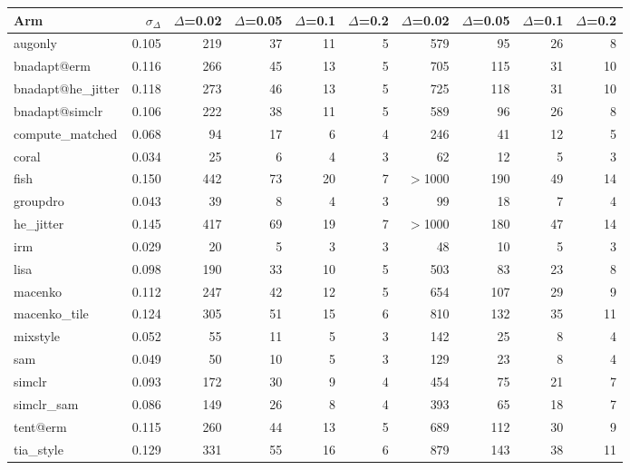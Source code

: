 \begin{tabular}{lrrrrrrrrr}
\toprule
Arm & $\sigma_\Delta$ & $\Delta$=0.02 & $\Delta$=0.05 & $\Delta$=0.1 & $\Delta$=0.2 & $\Delta$=0.02 & $\Delta$=0.05 & $\Delta$=0.1 & $\Delta$=0.2 \\
\midrule
augonly & 0.105 & 219 & 37 & 11 & 5 & 579 & 95 & 26 & 8 \\
bnadapt@erm & 0.116 & 266 & 45 & 13 & 5 & 705 & 115 & 31 & 10 \\
bnadapt@he\_jitter & 0.118 & 273 & 46 & 13 & 5 & 725 & 118 & 31 & 10 \\
bnadapt@simclr & 0.106 & 222 & 38 & 11 & 5 & 589 & 96 & 26 & 8 \\
compute\_matched & 0.068 & 94 & 17 & 6 & 4 & 246 & 41 & 12 & 5 \\
coral & 0.034 & 25 & 6 & 4 & 3 & 62 & 12 & 5 & 3 \\
fish & 0.150 & 442 & 73 & 20 & 7 & $>$1000 & 190 & 49 & 14 \\
groupdro & 0.043 & 39 & 8 & 4 & 3 & 99 & 18 & 7 & 4 \\
he\_jitter & 0.145 & 417 & 69 & 19 & 7 & $>$1000 & 180 & 47 & 14 \\
irm & 0.029 & 20 & 5 & 3 & 3 & 48 & 10 & 5 & 3 \\
lisa & 0.098 & 190 & 33 & 10 & 5 & 503 & 83 & 23 & 8 \\
macenko & 0.112 & 247 & 42 & 12 & 5 & 654 & 107 & 29 & 9 \\
macenko\_tile & 0.124 & 305 & 51 & 15 & 6 & 810 & 132 & 35 & 11 \\
mixstyle & 0.052 & 55 & 11 & 5 & 3 & 142 & 25 & 8 & 4 \\
sam & 0.049 & 50 & 10 & 5 & 3 & 129 & 23 & 8 & 4 \\
simclr & 0.093 & 172 & 30 & 9 & 4 & 454 & 75 & 21 & 7 \\
simclr\_sam & 0.086 & 149 & 26 & 8 & 4 & 393 & 65 & 18 & 7 \\
tent@erm & 0.115 & 260 & 44 & 13 & 5 & 689 & 112 & 30 & 9 \\
tia\_style & 0.129 & 331 & 55 & 16 & 6 & 879 & 143 & 38 & 11 \\
\bottomrule
\end{tabular}
